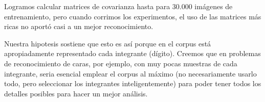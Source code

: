 Logramos calcular matrices de covarianza hasta para 30.000 im\'agenes de entrenamiento, pero cuando
corrimos los experimentos, el uso de las matrices m\'as ricas no aport\'o casi a un mejor reconocimiento.

Nuestra hipotesis sostiene que esto es as\'i porque en el corpus est\'a apropiadamente
representado cada integrante (d\'igito). Creemos que en problemas de
reconocimiento de caras, por ejemplo, con muy pocas muestras de cada integrante, 
seria esencial emplear el corpus al m\'aximo (no necesariamente
usarlo todo, pero seleccionar los integrantes inteligentemente) para poder tener todos los detalles
posibles para hacer un mejor an\'alisis.

